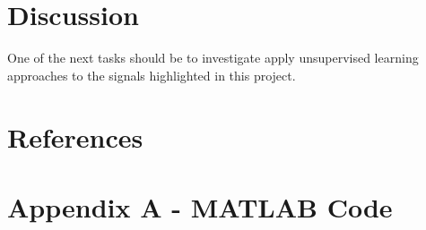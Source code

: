 \documentclass{article}
\begin{document}
\section{Discussion} 
One of the next tasks should be to investigate apply unsupervised learning approaches to the signals highlighted in this project.
\clearpage
\section{References} 

 

\clearpage  
\section{Appendix A - MATLAB Code}
\end{document}
